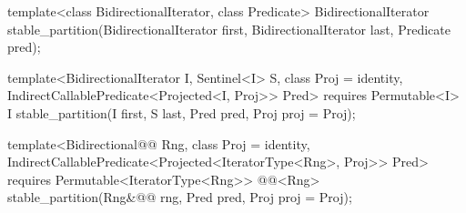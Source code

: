 %
\begin{removedblock}
\begin{itemdecl}
template<class BidirectionalIterator, class Predicate>
  BidirectionalIterator
    stable_partition(BidirectionalIterator first,
                     BidirectionalIterator last, Predicate pred);
\end{itemdecl}
\end{removedblock}
\begin{addedblock}
\begin{itemdecl}
template<BidirectionalIterator I, Sentinel<I> S, class Proj = identity,
    IndirectCallablePredicate<Projected<I, Proj>> Pred>
  requires Permutable<I>
  I stable_partition(I first, S last, Pred pred, Proj proj = Proj{});

template<Bidirectional@@ Rng, class Proj = identity,
    IndirectCallablePredicate<Projected<IteratorType<Rng>, Proj>> Pred>
  requires Permutable<IteratorType<Rng>>
  @@<Rng>
    stable_partition(Rng&@\newtxt{\&}@ rng, Pred pred, Proj proj = Proj{});
\end{itemdecl}
\end{addedblock}

